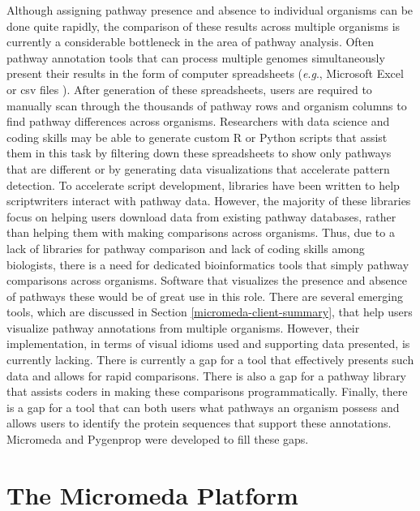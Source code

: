 Although assigning pathway presence and absence to individual organisms can be 
done quite rapidly, the comparison of these results across multiple organisms is 
currently a considerable bottleneck in the area of pathway analysis. Often 
pathway annotation tools that can process multiple genomes simultaneously 
present their results in the form of computer spreadsheets (\textit{e}.\textit{g}., Microsoft 
Excel or \gls{csv} files \cite{RFC4180}). After generation of these 
spreadsheets, users are required to manually scan through the thousands of 
pathway rows and organism columns to find pathway differences across organisms. 
Researchers with data science and coding skills may be able to generate custom R 
or Python scripts that assist them in this task by filtering down these 
spreadsheets to show only pathways that are different or by generating data 
visualizations that accelerate pattern detection. To accelerate script 
development, libraries have been written to help scriptwriters interact with 
pathway data. However, the majority of these libraries focus on helping users 
download data from existing pathway databases, rather than helping them with 
making comparisons across organisms. Thus, due to a lack of libraries for 
pathway comparison and lack of coding skills among biologists, there is a need 
for dedicated bioinformatics tools that simply pathway comparisons across 
organisms. Software that visualizes the presence and absence of pathways these 
would be of great use in this role. There are several emerging tools, which are 
discussed in Section \ref{micromeda-client-summary}, that help users visualize 
pathway annotations from multiple organisms. However, their implementation, in 
terms of visual idioms used and supporting data presented, is currently lacking. 
There is currently a gap for a tool that effectively presents such data and 
allows for rapid comparisons. There is also a gap for a pathway library that 
assists coders in making these comparisons programmatically. Finally, there is a 
gap for a tool that can both users what pathways an organism possess and allows 
users to identify the protein sequences that support these annotations. 
Micromeda and Pygenprop were developed to fill these gaps.

\section{The Micromeda Platform} \label{micromeda-overview}

